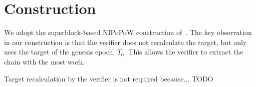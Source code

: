 \section{Construction}

We adopt the superblock-based NIPoPoW construction of~\cite{logspace}. The key
observation in our construction is that the verifier does not recalculate the
target, but only uses the target of the genesis epoch, $T_0$. This allows the
verifier to extract the chain with the most work.

Target recalculation by the verifier is not required because... TODO
